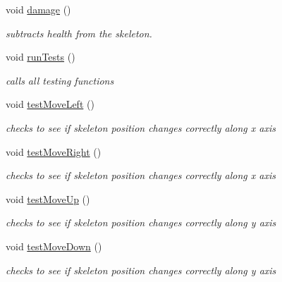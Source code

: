 \begin{DoxyCompactItemize}
\mbox{\label{classSkeleton_a43f844458b102aa18c65bcbbc5078e27}} 
void \mbox{\hyperlink{classSkeleton_a43f844458b102aa18c65bcbbc5078e27}{damage}} ()
\begin{DoxyCompactList}\small\item\em subtracts health from the skeleton. \end{DoxyCompactList}\item 
\mbox{\label{classSkeleton_a41d14404f1c8d295508f7043e314a731}} 
void \mbox{\hyperlink{classSkeleton_a41d14404f1c8d295508f7043e314a731}{run\+Tests}} ()
\begin{DoxyCompactList}\small\item\em calls all testing functions \end{DoxyCompactList}\item 
\mbox{\label{classSkeleton_a6188fba17d9a166d71cfcd7e2b27d5ec}} 
void \mbox{\hyperlink{classSkeleton_a6188fba17d9a166d71cfcd7e2b27d5ec}{test\+Move\+Left}} ()
\begin{DoxyCompactList}\small\item\em checks to see if skeleton position changes correctly along x axis \end{DoxyCompactList}\item 
\mbox{\label{classSkeleton_aa495a3cad8742af1b6fe06450f1d1add}} 
void \mbox{\hyperlink{classSkeleton_aa495a3cad8742af1b6fe06450f1d1add}{test\+Move\+Right}} ()
\begin{DoxyCompactList}\small\item\em checks to see if skeleton position changes correctly along x axis \end{DoxyCompactList}\item 
\mbox{\label{classSkeleton_a57e8784bea0a76af7c86536673edd15c}} 
void \mbox{\hyperlink{classSkeleton_a57e8784bea0a76af7c86536673edd15c}{test\+Move\+Up}} ()
\begin{DoxyCompactList}\small\item\em checks to see if skeleton position changes correctly along y axis \end{DoxyCompactList}\item 
\mbox{\label{classSkeleton_ae92e985bae7156d0c7ebaacc7bcf2019}} 
void \mbox{\hyperlink{classSkeleton_ae92e985bae7156d0c7ebaacc7bcf2019}{test\+Move\+Down}} ()
\begin{DoxyCompactList}\small\item\em checks to see if skeleton position changes correctly along y axis \end{DoxyCompactList}\end{DoxyCompactItemize}

